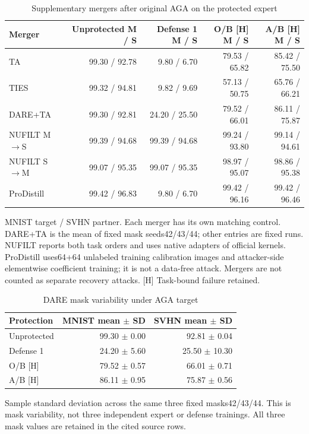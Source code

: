 \begin{table}[!htbp]
\centering
\small
\caption{Supplementary mergers after original AGA on the protected expert}
\label{tab:mergers}
\begin{tabular}{lrrrr}
\toprule
Merger & Unprotected M / S & Defense 1 M / S & O/B [H] M / S & A/B [H] M / S \\
\midrule
TA & 99.30 / 92.78 & 9.80 / 6.70 & 79.53 / 65.82 & 85.42 / 75.50 \\
TIES & 99.32 / 94.81 & 9.82 / 9.69 & 57.13 / 50.75 & 65.76 / 66.21 \\
DARE+TA & 99.30 / 92.81 & 24.20 / 25.50 & 79.52 / 66.01 & 86.11 / 75.87 \\
NUFILT M$\to$S & 99.39 / 94.68 & 99.39 / 94.68 & 99.24 / 93.80 & 99.14 / 94.61 \\
NUFILT S$\to$M & 99.07 / 95.35 & 99.07 / 95.35 & 98.97 / 95.07 & 98.86 / 95.38 \\
ProDistill & 99.42 / 96.83 & 9.80 / 6.70 & 99.42 / 96.16 & 99.42 / 96.46 \\
\bottomrule
\end{tabular}
\par\vspace{3pt}\begin{minipage}{0.98\linewidth}\footnotesize MNIST target / SVHN partner. Each merger has its own matching control. DARE+TA is the mean of fixed mask seeds42/43/44; other entries are fixed runs. NUFILT reports both task orders and uses native adapters of official kernels. ProDistill uses64+64 unlabeled training calibration images and attacker-side elementwise coefficient training; it is not a data-free attack. Mergers are not counted as separate recovery attacks. [H] Task-bound failure retained.\end{minipage}
\end{table}

\begin{table}[!htbp]
\centering
\small
\caption{DARE mask variability under AGA target}
\label{tab:dare}
\begin{tabular}{lrr}
\toprule
Protection & MNIST mean $\pm$ SD & SVHN mean $\pm$ SD \\
\midrule
Unprotected & 99.30 $\pm$ 0.00 & 92.81 $\pm$ 0.04 \\
Defense 1 & 24.20 $\pm$ 5.60 & 25.50 $\pm$ 10.30 \\
O/B [H] & 79.52 $\pm$ 0.57 & 66.01 $\pm$ 0.71 \\
A/B [H] & 86.11 $\pm$ 0.95 & 75.87 $\pm$ 0.56 \\
\bottomrule
\end{tabular}
\par\vspace{3pt}\begin{minipage}{0.98\linewidth}\footnotesize Sample standard deviation across the same three fixed masks42/43/44. This is mask variability, not three independent expert or defense trainings. All three mask values are retained in the cited source rows.\end{minipage}
\end{table}

